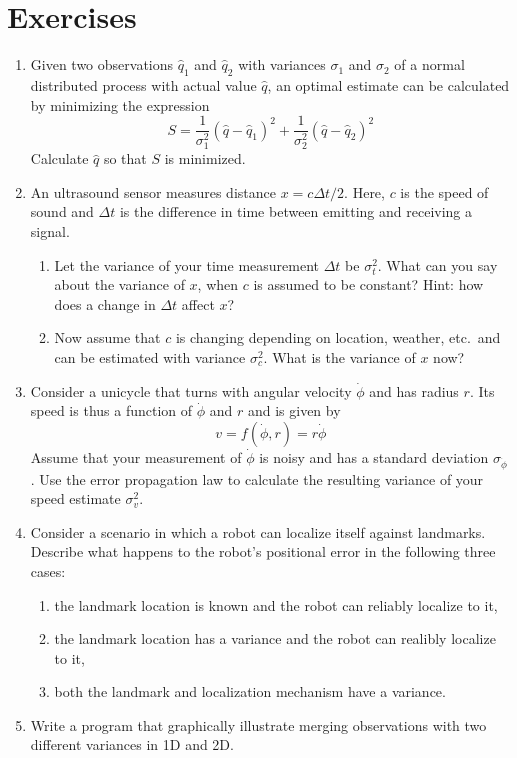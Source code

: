 \section*{Exercises}\small
\begin{enumerate}
\item Given two observations $\hat{q}_1$ and $\hat{q}_2$ with variances $\sigma_1$ and $\sigma_2$ of a normal distributed process with actual value $\hat{q}$, an optimal estimate can be calculated by minimizing the expression
\begin{equation}
\nonumber
S=\frac{1}{\sigma_1^2}(\hat{q}-\hat{q}_1)^2+\frac{1}{\sigma_2^2}(\hat{q}-\hat{q}_2)^2
\end{equation}
Calculate $\hat{q}$ so that $S$ is minimized.
\item An ultrasound sensor measures distance $x=c\Delta t/2$. Here, $c$ is the speed of sound and $\Delta t$ is the difference in time between emitting and receiving a signal.
\begin{enumerate}
\item Let the variance of your time measurement $\Delta t$ be $\sigma_t^2$. What can you say about the variance of $x$, when $c$ is assumed to be constant? Hint: how does a change in $\Delta t$ affect $x$?
\item Now assume that $c$ is changing depending on location, weather, etc.\ and can be estimated with variance $\sigma_c^2$. What is the variance of $x$ now?
\end{enumerate}
\item Consider a unicycle that turns with angular velocity $\dot{\phi}$ and has radius $r$. Its speed is thus a function of $\dot{\phi}$ and $r$ and is given by
\begin{equation}
\nonumber
v=f(\dot{\phi},r)=r\dot{\phi}
\end{equation}
Assume that your measurement of $\dot{\phi}$ is noisy and has a standard deviation $\sigma_{\dot{\phi}}$.  Use the error propagation law to calculate the resulting variance of your speed estimate $\sigma_v^2$.
\item Consider a scenario in which a robot can localize itself against landmarks. Describe what happens to the robot's positional error in the following three cases:
\begin{enumerate}
\item the landmark location is known and the robot can reliably localize to it,
\item the landmark location has a variance and the robot can realibly localize to it,
\item both the landmark and localization mechanism have a variance.
\end{enumerate}
\item Write a program that graphically illustrate merging observations with two different variances in 1D and 2D.
\end{enumerate}
\normalsize
